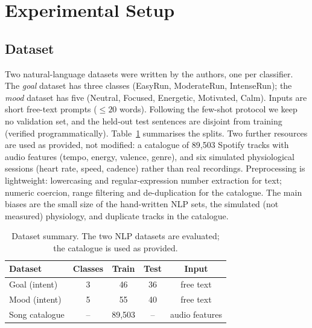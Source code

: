 \documentclass[11pt,a4paper]{article}
\begin{document}

	\section{Experimental Setup}

	\subsection{Dataset}

	Two natural-language datasets were written by the authors, one per classifier. The \emph{goal} dataset has three classes (EasyRun, ModerateRun, IntenseRun); the \emph{mood} dataset has five (Neutral, Focused, Energetic, Motivated, Calm). Inputs are short free-text prompts ($\leq 20$ words). Following the few-shot protocol we keep no validation set, and the held-out test sentences are disjoint from training (verified programmatically). Table~\ref{tab:dataset} summarises the splits. Two further resources are used as provided, not modified: a catalogue of 89{,}503 Spotify tracks with audio features (tempo, energy, valence, genre), and six simulated physiological sessions (heart rate, speed, cadence) rather than real recordings. Preprocessing is lightweight: lowercasing and regular-expression number extraction for text; numeric coercion, range filtering and de-duplication for the catalogue. The main biases are the small size of the hand-written NLP sets, the simulated (not measured) physiology, and duplicate tracks in the catalogue.

	\begin{table}[h]
		\centering
		\caption{Dataset summary. The two NLP datasets are evaluated; the catalogue is used as provided.}
		\label{tab:dataset}
		\begin{tabular}{|l|c|c|c|c|}
			\hline
			\textbf{Dataset} & \textbf{Classes} & \textbf{Train} & \textbf{Test} & \textbf{Input} \\
			\hline
			Goal (intent) & 3 & 46 & 36 & free text \\
			Mood (intent) & 5 & 55 & 40 & free text \\
			Song catalogue & -- & 89{,}503 & -- & audio features \\
			\hline
		\end{tabular}
	\end{table}
\end{document}
